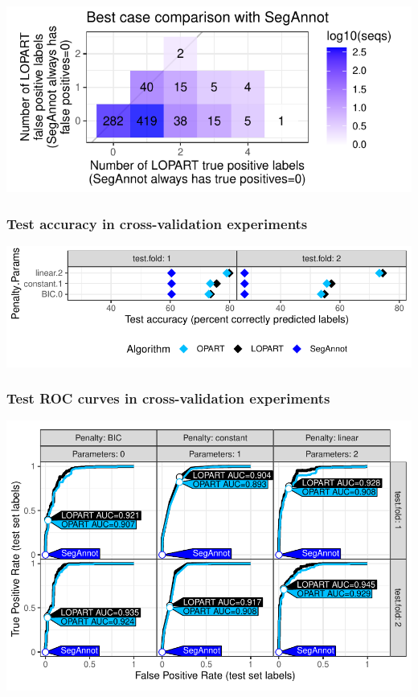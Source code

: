 \documentclass{beamer}
\begin{document}
\begin{frame}
  \includegraphics[width=\textwidth]{figure-label-errors-SegAnnot}
\end{frame}

\begin{frame}
  \frametitle{Test accuracy in cross-validation experiments}
  \includegraphics[width=\textwidth]{figure-cv-BIC}
  
\end{frame}

\begin{frame}
  \frametitle{Test ROC curves in cross-validation experiments}
  \includegraphics[width=\textwidth]{figure-cv-BIC-roc}
  
\end{frame}
\end{document}
